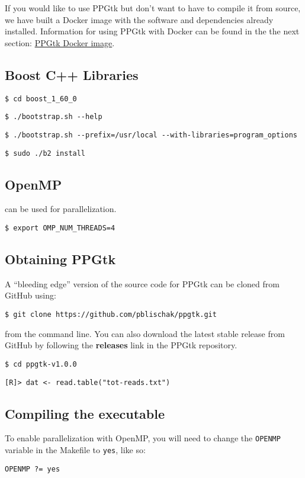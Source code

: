 \documentclass[11pt,english,letterpaper,oneside]{article}
\newcommand{\code}[1]{\hspace{5pt} \texttt{\$ #1}}
\newcommand{\rcode}[1]{\hspace{5pt} \texttt{[R]> #1}}
\newcommand{\makefile}[1]{\hspace{5pt} \texttt{#1}}
\begin{document}
\hspace{15pt} If you would like to use PPGtk but don't want to have to compile it from source, we have built a Docker image with the software and dependencies already installed. Information for using PPGtk with Docker can be found in the the next section: \hyperref[ppgtk-docker]{PPGtk Docker image}.

\subsection{Boost C++ Libraries}


\code{cd boost\_1\_60\_0}

\code{./bootstrap.sh -{}-help}

\code{./bootstrap.sh -{}-prefix=/usr/local -{}-with-libraries=program\_options}

\code{sudo ./b2 install}

\subsection{OpenMP}

can be used for parallelization.

\code{export OMP\_NUM\_THREADS=4}

\subsection{Obtaining PPGtk}

A ``bleeding edge'' version of the source code for PPGtk can be cloned from GitHub using:

\code{git clone https://github.com/pblischak/ppgtk.git}

from the command line. You can also download the latest stable release from GitHub by following the \textbf{releases} link in the PPGtk repository.

\code{cd ppgtk-v1.0.0}

\rcode{dat <- read.table("tot-reads.txt")}

\subsection{Compiling the executable}

To enable parallelization with OpenMP, you will need to change the \texttt{OPENMP} variable in the Makefile to \texttt{yes}, like so:

\makefile{OPENMP ?= yes}
\end{document}
